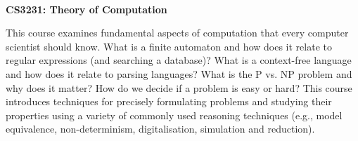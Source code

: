 \documentclass[10pt]{article}
\begin{document}
\thispagestyle{empty}
\bigskip \
\vspace{0.1cm}

\begin{center}
{\fontsize{30}{30} \selectfont \bf \sffamily CS3231: Theory of Computation }\\
\vspace{24pt}
\end{center}

{\parindent0pt \baselineskip=15.5pt 
  This course examines fundamental aspects of computation that every computer
  scientist should know. What is a finite automaton and how does it relate to
  regular expressions (and searching a database)? What is a context-free
  language and how does it relate to parsing languages? What is the P vs. NP
  problem and why does it matter? How do we decide if a problem is easy or
  hard? This course introduces techniques for precisely formulating problems
  and studying their properties using a variety of commonly used reasoning
  techniques (e.g., model equivalence, non-determinism, digitalisation,
  simulation and reduction).
}

\microtoc%
\newpage






\end{document}
